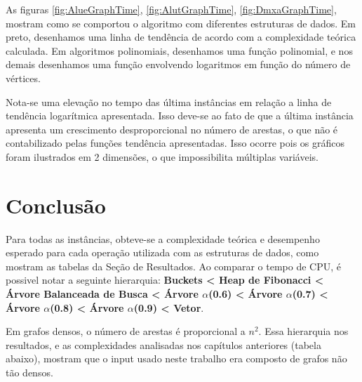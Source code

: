 \documentclass[
	12pt,				%
	oneside,			%
	a4paper,			%
	english,			%
	french,				%
	spanish,			%
	brazil,				%
	]{abntex2}
\begin{document}
As figuras \ref{fig:AlueGraphTime},  \ref{fig:AlutGraphTime}, \ref{fig:DmxaGraphTime},    mostram como se comportou o algoritmo com diferentes estruturas de dados. Em preto, desenhamos uma linha de tendência de acordo com a complexidade teórica calculada. Em algoritmos polinomiais, desenhamos uma função polinomial, e nos demais desenhamos uma função envolvendo logaritmos em função do número de vértices.

Nota-se uma elevação no tempo das última instâncias em relação a linha de tendência logarítmica apresentada. Isso deve-se ao fato de que a última instância apresenta um crescimento desproporcional no número de arestas, o que não é contabilizado pelas funções tendência apresentadas. Isso ocorre pois os gráficos foram ilustrados em 2 dimensões, o que impossibilita múltiplas variáveis.

% 

\chapter*[Conclusão]{Conclusão}


Para todas as instâncias, obteve-se a complexidade teórica e desempenho esperado para cada operação utilizada com as estruturas de dados, como mostram as tabelas da Seção de Resultados. Ao comparar o tempo de CPU, é possivel notar a seguinte hierarquia: \textbf{Buckets < Heap de Fibonacci < Árvore Balanceada de Busca < Árvore $\alpha$(0.6) <  Árvore $\alpha$(0.7) <  Árvore $\alpha$(0.8) <  Árvore $\alpha$(0.9) < Vetor}.

Em grafos densos, o número de arestas é proporcional a $n^2$. Essa hierarquia nos resultados, e as complexidades analisadas nos capítulos anteriores (tabela abaixo), mostram que o input usado neste trabalho era composto de grafos não tão densos.
\end{document}
